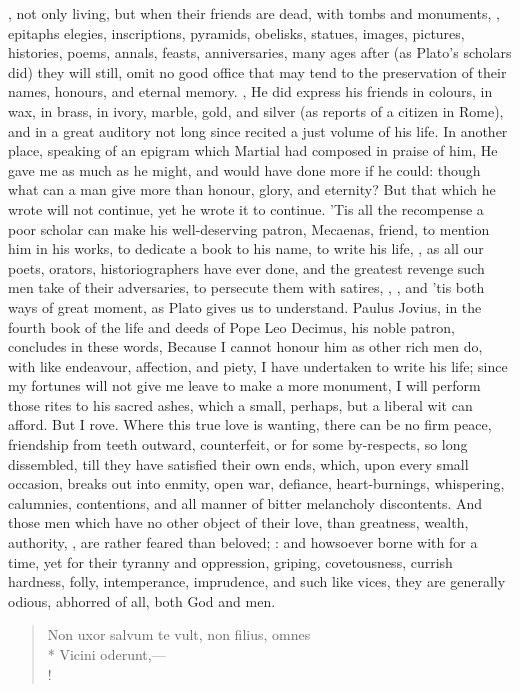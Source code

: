 {, not only living, but when
their friends are dead, with tombs and monuments, , epitaphs
elegies, inscriptions, pyramids, obelisks, statues, images, pictures,
histories, poems, annals, feasts, anniversaries, many ages after (as
Plato's scholars did) they will  still, omit no good office
that may tend to the preservation of their names, honours, and eternal
memory. , \etc{} He did
express his friends in colours, in wax, in brass, in ivory, marble,
gold, and silver (as \Pliny{} reports of a citizen in Rome), and in a
great auditory not long since recited a just volume of his life. In
another place, speaking of an epigram which Martial had composed
in praise of him, He gave me as much as he might, and would have
done more if he could: though what can a man give more than honour,
glory, and eternity? But that which he wrote  will not
continue, yet he wrote it to continue. 'Tis all the recompense a poor
scholar can make his well-deserving patron, Mecaenas, friend, to
mention him in his works, to dedicate a book to his name, to write his
life, \etc{}, as all our poets, orators, historiographers have ever done,
and the greatest revenge such men take of their adversaries, to
persecute them with satires, , \etc{}, and 'tis both ways of
great moment, as  Plato gives us to understand. Paulus Jovius, in
the fourth book of the life and deeds of Pope Leo Decimus, his noble
patron, concludes in these words, Because I cannot honour him as
other rich men do, with like endeavour, affection, and piety, I have
undertaken to write his life; since my fortunes will not give me leave
to make a more  monument, I will perform those rites to his
sacred ashes, which a small, perhaps, but a liberal wit can afford. But
I rove. Where this true love is wanting, there can be no firm peace,
friendship from teeth outward, counterfeit, or for some by-respects, so
long dissembled, till they have satisfied their own ends, which, upon
every small occasion, breaks out into enmity, open war, defiance,
heart-burnings, whispering, calumnies, contentions, and all manner of
bitter melancholy discontents. And those men which have no other object
of their love, than greatness, wealth, authority, \etc{}, are rather
feared than beloved; : and
howsoever borne with for a time, yet for their tyranny and oppression,
griping, covetousness, currish hardness, folly, intemperance,
imprudence, and such like vices, they are generally odious, abhorred of
all, both God and men.
%
\begin{latin}
\begin{verse}
Non uxor salvum te vult, non filius, omnes\\*
Vicini oderunt,---\\!
\end{verse}
\end{latin}

}

